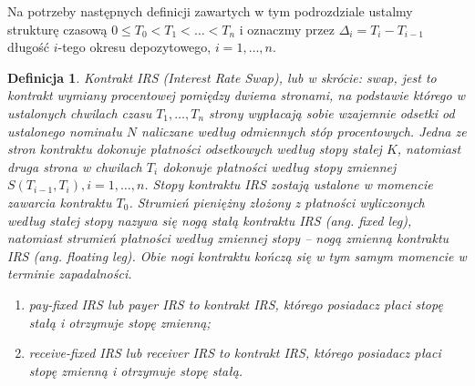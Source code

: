 \documentclass{mini}
\theoremstyle{mythstyle}
\newtheorem{Definicja}{Definicja}[chapter]
\begin{document}
	Na potrzeby następnych definicji zawartych w tym podrozdziale ustalmy strukturę czasową $0\leq T_0<T_1< \ldots < T_n$ i
	oznaczmy przez $\Delta_i = T_i-T_{i-1}$ długość $i$-tego okresu depozytowego, $i=1,\ldots,n$.\\

\begin{Definicja}
	Kontrakt IRS (Interest Rate Swap), lub w skrócie: swap, jest to kontrakt wymiany procentowej pomiędzy dwiema stronami, na podstawie którego w ustalonych chwilach czasu $T_1,\ldots,T_n$ strony wypłacają sobie wzajemnie odsetki od ustalonego nominału $N$  naliczane według odmiennych stóp procentowych. Jedna ze stron kontraktu dokonuje płatności odsetkowych według stopy stałej $K$, natomiast druga strona w chwilach $T_i$ dokonuje płatności według stopy zmiennej $S(T_{i-1},T_i), i=1,\ldots,n$. Stopy kontraktu IRS zostają ustalone w momencie zawarcia kontraktu $T_0$. Strumień pieniężny złożony z płatności wyliczonych według stałej stopy nazywa się nogą stałą kontraktu IRS (ang. fixed leg), natomiast strumień płatności według zmiennej stopy -- nogą zmienną kontraktu IRS (ang. floating leg). Obie nogi kontraktu kończą się w tym samym momencie w terminie zapadalności.
	\begin{enumerate}
		\item pay-fixed IRS lub payer IRS to kontrakt IRS, którego posiadacz płaci stopę stałą i otrzymuje stopę zmienną;
		\item receive-fixed IRS lub receiver IRS to kontrakt IRS, którego posiadacz płaci stopę zmienną i otrzymuje stopę stałą.
	\end{enumerate}
\end{Definicja}
\end{document}
